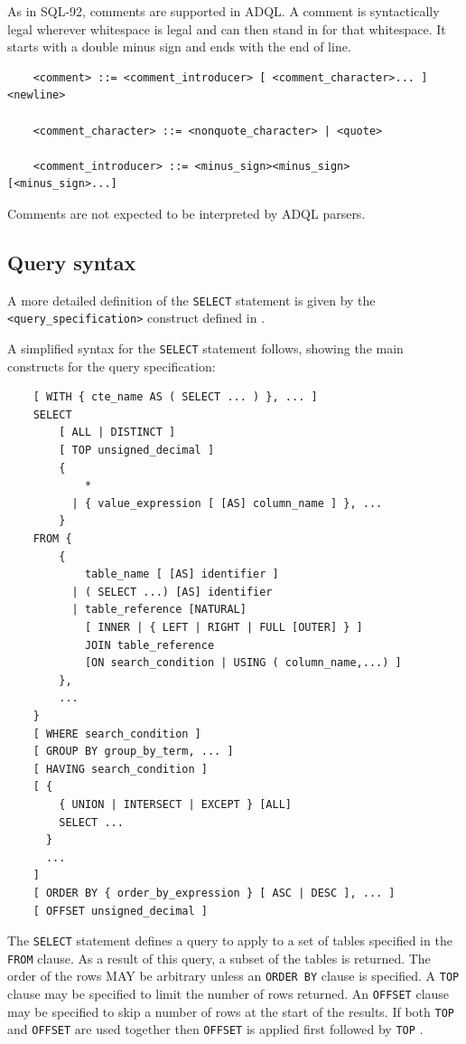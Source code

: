 \documentclass[11pt,a4paper]{ivoa}
\begin{document}
As in SQL-92, comments are supported in ADQL. A comment is syntactically legal
wherever whitespace is legal and can then stand in for that whitespace. It
starts with a double minus sign and ends with the end of line.

\begin{verbatim}
    <comment> ::= <comment_introducer> [ <comment_character>... ] <newline>

    <comment_character> ::= <nonquote_character> | <quote>

    <comment_introducer> ::= <minus_sign><minus_sign> [<minus_sign>...]
\end{verbatim}

Comments are not expected to be interpreted by ADQL parsers.

\clearpage %
\subsection{Query syntax}
\label{sec:syntax}

A more detailed definition of the \verb:SELECT: statement is given by the \verb:<query_specification>:
construct defined in .

A simplified syntax for the \verb:SELECT: statement follows, showing the main constructs for
the query specification:

\begin{verbatim}
    [ WITH { cte_name AS ( SELECT ... ) }, ... ]
    SELECT
        [ ALL | DISTINCT ]
        [ TOP unsigned_decimal ]
        {
            *
          | { value_expression [ [AS] column_name ] }, ...
        }
    FROM {
        {
            table_name [ [AS] identifier ]
          | ( SELECT ...) [AS] identifier
          | table_reference [NATURAL]
            [ INNER | { LEFT | RIGHT | FULL [OUTER] } ]
            JOIN table_reference
            [ON search_condition | USING ( column_name,...) ]
        },
        ...
    }
    [ WHERE search_condition ]
    [ GROUP BY group_by_term, ... ]
    [ HAVING search_condition ]
    [ {
        { UNION | INTERSECT | EXCEPT } [ALL]
        SELECT ...
      }
      ...
    ]
    [ ORDER BY { order_by_expression } [ ASC | DESC ], ... ]
    [ OFFSET unsigned_decimal ]
\end{verbatim}

The \verb:SELECT: statement defines a query to apply to a set of tables specified
in the \verb:FROM: clause. As a result of this query, a subset of the tables
is returned.
The order of the rows MAY be arbitrary unless an \verb:ORDER BY: clause is specified.
A \verb:TOP: clause may be specified to limit the number of rows returned.
An \verb:OFFSET: clause may be specified to skip a number of rows at the start
of the results.
If both \verb:TOP: and \verb:OFFSET: are used together then \verb:OFFSET: is applied
first followed by \verb:TOP: .
\end{document}
